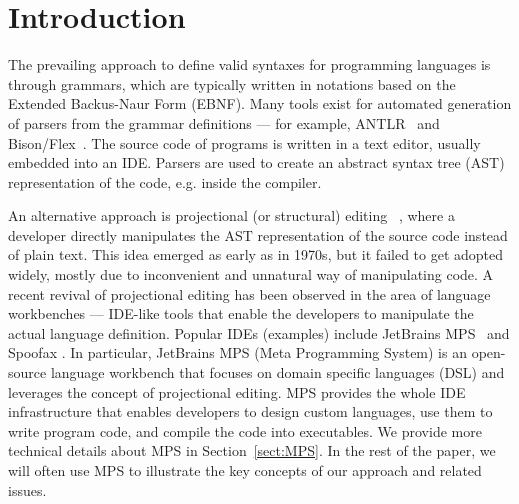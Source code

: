 \section{Introduction}

The prevailing approach to define valid syntaxes for programming languages is through grammars, which are typically written in notations based on the Extended Backus-Naur Form (EBNF).
Many tools exist for automated generation of parsers from the grammar definitions --- for example, ANTLR~\cite{ref:ANTLRBOOK,ref:ANTLR} and Bison/Flex~\cite{ref:BISONFLEX}.
The source code of programs is written in a text editor, usually embedded into an IDE. Parsers are used to create an abstract syntax tree (AST) representation of the code, e.g. inside the compiler.

An alternative approach is projectional (or structural) editing~\cite{ref:VWK15} , where a developer directly manipulates the AST representation of the source code instead of plain text.
This idea emerged as early as in 1970s, but it failed to get adopted widely, mostly due to inconvenient and unnatural way of manipulating code.
A recent revival of projectional editing has been observed in the area of language workbenches --- IDE-like tools that enable the developers to manipulate the actual language definition.
Popular IDEs (examples) include JetBrains MPS~\cite{ref:MPS,ref:MPSBOOK} and Spoofax .
In particular, JetBrains MPS (Meta Programming System) is an open-source language workbench that focuses on domain specific languages (DSL) and leverages the concept of projectional editing.
MPS provides the whole IDE infrastructure that enables developers to design custom languages, use them to write program code, and compile the code into executables.
We provide more technical details about MPS in Section~\ref{sect:MPS}.
In the rest of the paper, we will often use  MPS to illustrate the key concepts of our approach and related issues.


